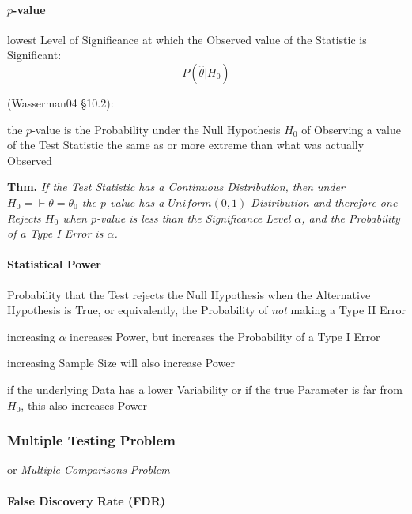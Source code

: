 \paragraph{$p$-value}\label{sec:p_value}\hfill

lowest Level of Significance at which the Observed value of the Statistic is
Significant:
\[
  P(\hat{\theta} | H_0)
\]

(Wasserman04 \S10.2):

the $p$-value is the Probability under the Null Hypothesis $H_0$ of Observing a
value of the Test Statistic the same as or more extreme than what was actually
Observed

\textbf{Thm.} \emph{
  If the Test Statistic has a Continuous Distribution, then under
  $H_0 = \vdash \theta = \theta_0$ the $p$-value has a $Uniform(0,1)$
  Distribution and therefore one Rejects $H_0$ when $p$-value is less than the
  Significance Level $\alpha$, and the Probability of a Type I Error is
  $\alpha$.
}



\paragraph{Statistical Power}\label{sec:statistical_power}\hfill

Probability that the Test rejects the Null Hypothesis when the Alternative
Hypothesis is True, or equivalently, the Probability of \emph{not} making a Type
II Error

increasing $\alpha$ increases Power, but increases the Probability of a Type I
Error

increasing Sample Size will also increase Power

if the underlying Data has a lower Variability or if the true Parameter is far
from $H_0$, this also increases Power



\subsubsection{Multiple Testing Problem}\label{sec:multiple_testing}

or \emph{Multiple Comparisons Problem}




\paragraph{False Discovery Rate (FDR)}\label{sec:fdr}\hfill

